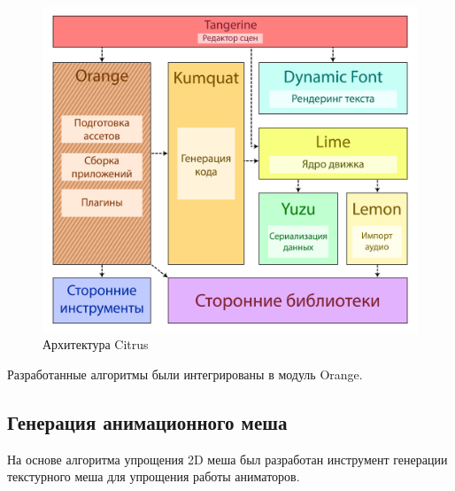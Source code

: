 \documentclass{fefu_thesis/cls/fefu}
\begin{document}
    \begin{figure}[H]
        \centering
        \includegraphics[scale=0.2]{images/CitrusArchitecture.png}
        \caption{Архитектура Citrus}
    \end{figure}

    Разработанные алгоритмы были интегрированы в модуль Orange.

    \subsection{Генерация анимационного меша}

    На основе алгоритма упрощения 2D меша был разработан инструмент генерации текстурного меша для упрощения работы аниматоров.
\end{document}
